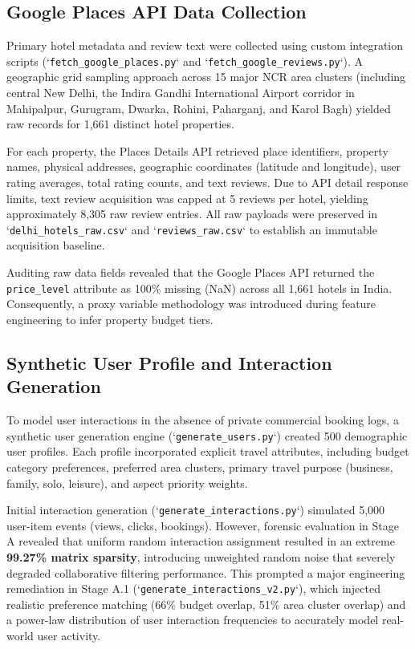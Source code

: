 \subsection{Google Places API Data Collection}
Primary hotel metadata and review text were collected using custom integration scripts (`\texttt{fetch\_google\_places.py}` and `\texttt{fetch\_google\_reviews.py}`). A geographic grid sampling approach across 15 major NCR area clusters (including central New Delhi, the Indira Gandhi International Airport corridor in Mahipalpur, Gurugram, Dwarka, Rohini, Paharganj, and Karol Bagh) yielded raw records for 1,661 distinct hotel properties.

For each property, the Places Details API retrieved place identifiers, property names, physical addresses, geographic coordinates (latitude and longitude), user rating averages, total rating counts, and text reviews. Due to API detail response limits, text review acquisition was capped at 5 reviews per hotel, yielding approximately 8,305 raw review entries. All raw payloads were preserved in `\texttt{delhi\_hotels\_raw.csv}` and `\texttt{reviews\_raw.csv}` to establish an immutable acquisition baseline.

Auditing raw data fields revealed that the Google Places API returned the \texttt{price\_level} attribute as 100\% missing (NaN) across all 1,661 hotels in India. Consequently, a proxy variable methodology was introduced during feature engineering to infer property budget tiers.

\subsection{Synthetic User Profile and Interaction Generation}
To model user interactions in the absence of private commercial booking logs, a synthetic user generation engine (`\texttt{generate\_users.py}`) created 500 demographic user profiles. Each profile incorporated explicit travel attributes, including budget category preferences, preferred area clusters, primary travel purpose (business, family, solo, leisure), and aspect priority weights.

Initial interaction generation (`\texttt{generate\_interactions.py}`) simulated 5,000 user-item events (views, clicks, bookings). However, forensic evaluation in Stage A revealed that uniform random interaction assignment resulted in an extreme \textbf{99.27\% matrix sparsity}, introducing unweighted random noise that severely degraded collaborative filtering performance. This prompted a major engineering remediation in Stage A.1 (`\texttt{generate\_interactions\_v2.py}`), which injected realistic preference matching (66\% budget overlap, 51\% area cluster overlap) and a power-law distribution of user interaction frequencies to accurately model real-world user activity.


